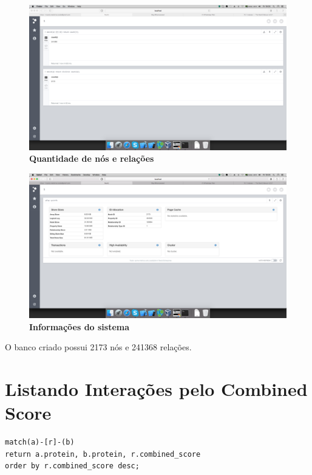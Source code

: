 \documentclass[a4paper, 12pt]{article}
\begin{document}
\begin{flushleft}
\begin{figure}[H]
  \centering
  \includegraphics[width=1\textwidth]{1}
  \caption[1 - Quantidade de nós e relações]{\textbf{Quantidade de nós e relações}}
\end{figure} 

\begin{figure}[H]
  \centering
  \includegraphics[width=1\textwidth]{2}
  \caption[2 - Informações do sistema]{\textbf{Informações do sistema}}
\end{figure}

O banco criado possui 2173 nós e 241368 relações.

\section{Listando Interações pelo Combined Score}

\begin{lstlisting}[frame=single]
match(a)-[r]-(b)
return a.protein, b.protein, r.combined_score
order by r.combined_score desc;
\end{lstlisting}


\end{flushleft}
\end{document}
